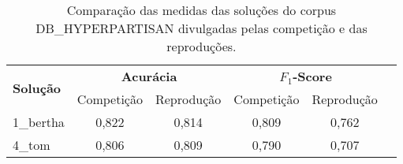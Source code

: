 \begin{table}[!thb]
    \centering
    \caption{Comparação das medidas das soluções do corpus DB\_HYPERPARTISAN divulgadas pelas competição e das reproduções.}
    \begin{adjustbox}{max width={\textwidth},keepaspectratio}%
    \begin{tabular}{|l|c|c|c|c|c|}
        \hline
        \multirow{2}{*}{\textbf{Solução}}
        & \multicolumn{2}{|c|}{\textbf{Acurácia}}
        & \multicolumn{2}{|c|}{\textbf{$F_1$-Score}}
        \\ \cline{2-5}    
        & Competição    & Reprodução
        & Competição    & Reprodução 
        \\ \hline
        1\_bertha        
        & 0,822         & 0,814
        & 0,809         & 0,762
        \\ \hline
        4\_tom
        & 0,806         & 0,809
        & 0,790         & 0,707              
        \\ 
        \hline
    \end{tabular}
    \end{adjustbox}
    \\
    \label{tab:reprodução-db-hyperpartisan} 
\end{table}
